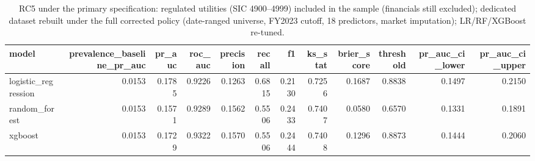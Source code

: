 \begin{table}[htbp]
\centering
\caption{RC5 under the primary specification: regulated utilities (SIC 4900--4999) included in the sample (financials still excluded); dedicated dataset rebuilt under the full corrected policy (date-ranged universe, FY2023 cutoff, 18 predictors, market imputation); LR/RF/XGBoost re-tuned.}
\label{tab:v2_rc5}
\small
\begin{tabular}{lrrrrrrrrrrr}
\toprule
model & prevalence\_baseline\_pr\_auc & pr\_auc & roc\_auc & precision & recall & f1 & ks\_stat & brier\_score & threshold & pr\_auc\_ci\_lower & pr\_auc\_ci\_upper \\
\midrule
logistic\_regression & 0.0153 & 0.1785 & 0.9226 & 0.1263 & 0.6815 & 0.2130 & 0.7256 & 0.1687 & 0.8838 & 0.1497 & 0.2150 \\
random\_forest & 0.0153 & 0.1571 & 0.9289 & 0.1562 & 0.5506 & 0.2433 & 0.7407 & 0.0580 & 0.6570 & 0.1331 & 0.1891 \\
xgboost & 0.0153 & 0.1729 & 0.9322 & 0.1570 & 0.5506 & 0.2444 & 0.7408 & 0.1296 & 0.8873 & 0.1444 & 0.2060 \\
\bottomrule
\end{tabular}
\end{table}
